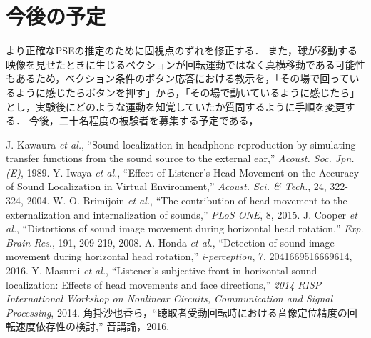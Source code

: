 \documentclass[12pt,a4j]{jsarticle}
\renewcommand{\ }{\hspace{1zw}}
\begin{document}
\section{今後の予定}
\ より正確なPSEの推定のために固視点のずれを修正する．
また，球が移動する映像を見せたときに生じるベクションが回転運動ではなく真横移動である可能性もあるため，ベクション条件のボタン応答における教示を，「その場で回っているように感じたらボタンを押す」から，「その場で動いているように感じたら」とし，実験後にどのような運動を知覚していたか質問するように手順を変更する．
今後，二十名程度の被験者を募集する予定である，

\begin{thebibliography}{1}
     J. Kawaura {\it et al.}, ``Sound localization in headphone reproduction by simulating transfer functions from the sound source to the external ear,'' {\it Acoust. Soc. Jpn.(E)}, 1989.
     Y. Iwaya {\it et al.}, ``Effect of Listener's Head Movement on the Accuracy of Sound Localization in Virtual Environment,'' {\it Acoust. Sci. \& Tech.}, 24, 322-324, 2004.
     W. O. Brimijoin {\it et al.}, ``The contribution of head movement to the externalization and internalization of sounds,'' {\it PLoS ONE}, 8, 2015.
     J. Cooper {\it et al.}, ``Distortions of sound image movement during horizontal head rotation,'' {\it Exp. Brain Res}., 191, 209-219, 2008.
     A. Honda {\it et al.}, ``Detection of sound image movement during horizontal head rotation,'' {\it i-perception}, 7, 2041669516669614, 2016.
     Y. Masumi {\it et al.}, ``Listener's subjective front in horizontal sound localization: Effects of head movements and face directions,'' {\it 2014 RISP International Workshop on Nonlinear Circuits, Communication and Signal Processing}, 2014.
     角掛沙也香ら，``聴取者受動回転時における音像定位精度の回転速度依存性の検討,'' 音講論，2016.
\end{thebibliography}
\end{document}
